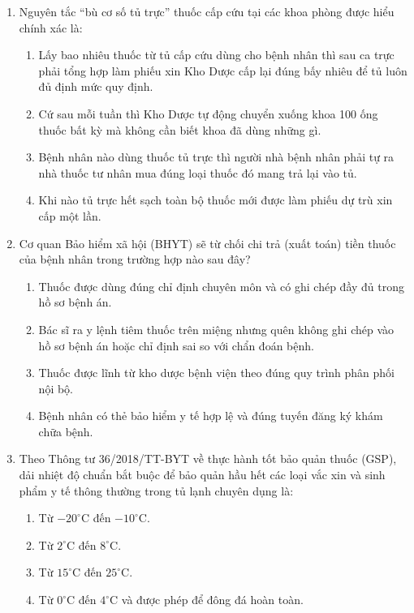\documentclass[12pt,a4paper]{article}
\begin{document}
\begin{enumerate}[label=\textbf{Câu \arabic*:}, leftmargin=*]
\item Nguyên tắc ``bù cơ số tủ trực'' thuốc cấp cứu tại các khoa phòng được hiểu chính xác là:
\begin{enumerate}[label=\textbf{\Alph*.}]
    \item Lấy bao nhiêu thuốc từ tủ cấp cứu dùng cho bệnh nhân thì sau ca trực phải tổng hợp làm phiếu xin Kho Dược cấp lại đúng bấy nhiêu để tủ luôn đủ định mức quy định.
    \item Cứ sau mỗi tuần thì Kho Dược tự động chuyển xuống khoa 100 ống thuốc bất kỳ mà không cần biết khoa đã dùng những gì.
    \item Bệnh nhân nào dùng thuốc tủ trực thì người nhà bệnh nhân phải tự ra nhà thuốc tư nhân mua đúng loại thuốc đó mang trả lại vào tủ.
    \item Khi nào tủ trực hết sạch toàn bộ thuốc mới được làm phiếu dự trù xin cấp một lần.
\end{enumerate}

\item Cơ quan Bảo hiểm xã hội (BHYT) sẽ từ chối chi trả (xuất toán) tiền thuốc của bệnh nhân trong trường hợp nào sau đây?
\begin{enumerate}[label=\textbf{\Alph*.}]
    \item Thuốc được dùng đúng chỉ định chuyên môn và có ghi chép đầy đủ trong hồ sơ bệnh án.
    \item Bác sĩ ra y lệnh tiêm thuốc trên miệng nhưng quên không ghi chép vào hồ sơ bệnh án hoặc chỉ định sai so với chẩn đoán bệnh.
    \item Thuốc được lĩnh từ kho dược bệnh viện theo đúng quy trình phân phối nội bộ.
    \item Bệnh nhân có thẻ bảo hiểm y tế hợp lệ và đúng tuyến đăng ký khám chữa bệnh.
\end{enumerate}

\item Theo Thông tư 36/2018/TT-BYT về thực hành tốt bảo quản thuốc (GSP), dải nhiệt độ chuẩn bắt buộc để bảo quản hầu hết các loại vắc xin và sinh phẩm y tế thông thường trong tủ lạnh chuyên dụng là:
\begin{enumerate}[label=\textbf{\Alph*.}]
    \item Từ $-20^\circ\text{C}$ đến $-10^\circ\text{C}$.
    \item Từ $2^\circ\text{C}$ đến $8^\circ\text{C}$.
    \item Từ $15^\circ\text{C}$ đến $25^\circ\text{C}$.
    \item Từ $0^\circ\text{C}$ đến $4^\circ\text{C}$ và được phép để đông đá hoàn toàn.
\end{enumerate}


\end{enumerate}
\end{document}
